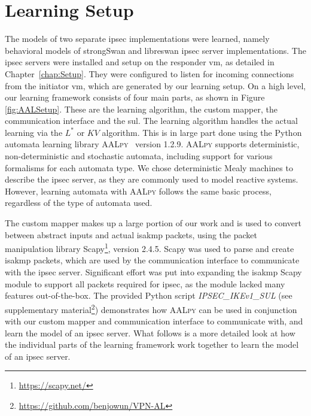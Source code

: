 \section{Learning Setup} \label{subsec:learningenv}%
The models of two separate \ac{ipsec} implementations were learned, namely behavioral models of strongSwan and libreswan \ac{ipsec} server implementations. The \ac{ipsec} servers were installed and setup on the responder \ac{vm}, as detailed in Chapter~\ref{chap:Setup}. They were configured to listen for incoming connections from the initiator \ac{vm}, which are generated by our learning setup. On a high level, our learning framework consists of four main parts, as shown in Figure \ref{fig:AALSetup}. These are the learning algorithm, the custom mapper, the communication interface and the \ac{sul}. The learning algorithm handles the actual learning via the $L^*$ or $KV$ algorithm. This is in large part done using the Python automata learning library \textsc{AALpy}~\cite{software:aalpy} version 1.2.9. \textsc{AALpy} supports deterministic, non-deterministic and stochastic automata, including support for various formalisms for each automata type. We chose deterministic Mealy machines to describe the \ac{ipsec} server, as they are commonly used to model reactive systems. However, learning automata with \textsc{AALpy} follows the same basic process, regardless of the type of automata used.

The custom mapper makes up a large portion of our work and is used to convert between abstract inputs and actual \ac{isakmp} packets, using the packet manipulation library Scapy\footnote{\url{https://scapy.net/}}, version 2.4.5. Scapy was used to parse and create \ac{isakmp} packets, which are used by the communication interface to communicate with the \ac{ipsec} server. Significant effort was put into expanding the \ac{isakmp} Scapy module to support all packets required for \ac{ipsec}, as the module lacked many features out-of-the-box. The provided Python script \emph{IPSEC\_IKEv1\_SUL} (see supplementary material\footnote{\url{https://github.com/benjowun/VPN-AL}}) demonstrates how \textsc{AALpy} can be used in conjunction with our custom mapper and communication interface to communicate with, and learn the model of an \ac{ipsec} server. What follows is a more detailed look at how the individual parts of the learning framework work together to learn the model of an \ac{ipsec} server.

